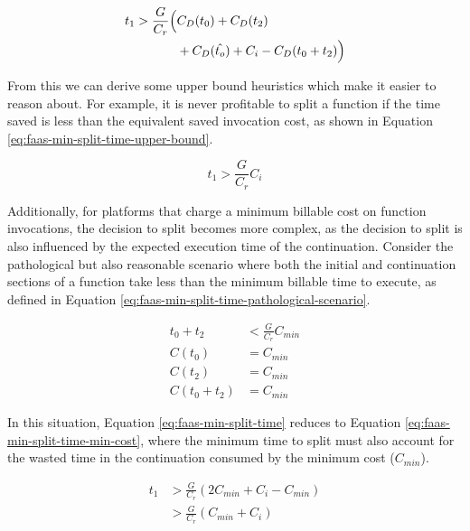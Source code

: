 \begin{equation} \label{eq:faas-min-split-time}
\begin{aligned}
t_1 > \frac{G}{C_r} \Bigl( & C_D(t_0) + C_D(t_2) \\
& + C_D(\hat{t_o}) + C_i - C_D(t_0 + t_2) \Bigl)
\end{aligned}
\end{equation}

From this we can derive some upper bound heuristics which make it easier to reason about. For example, it is never profitable to split a function if the time saved is less than the equivalent saved invocation cost, as shown in Equation \ref{eq:faas-min-split-time-upper-bound}.

\begin{equation} \label{eq:faas-min-split-time-upper-bound}
t_1 > \frac{G}{C_r} C_i
\end{equation}

Additionally, for platforms that charge a minimum billable cost on function invocations, the decision to split becomes more complex, as the decision to split is also influenced by the expected execution time of the continuation. Consider the pathological but also reasonable scenario where both the initial and continuation sections of a function take less than the minimum billable time to execute, as defined in Equation \ref{eq:faas-min-split-time-pathological-scenario}.

\begin{equation} \label{eq:faas-min-split-time-pathological-scenario}
\begin{aligned}
t_0 + t_2 & < \frac{G}{C_r} C_{min} \\
C(t_0) & = C_{min} \\
C(t_2) & = C_{min} \\
C(t_0 + t_2) & = C_{min}
\end{aligned}
\end{equation}

In this situation, Equation \ref{eq:faas-min-split-time} reduces to Equation \ref{eq:faas-min-split-time-min-cost}, where the minimum time to split must also account for the wasted time in the continuation consumed by the minimum cost ($C_{min}$).

\begin{equation} \label{eq:faas-min-split-time-min-cost}
\begin{aligned}
t_1 & > \frac{G}{C_r} \left( 2 C_{min} + C_i - C_{min} \right) \\
    & > \frac{G}{C_r} \left( C_{min} + C_i \right)
\end{aligned}
\end{equation}

